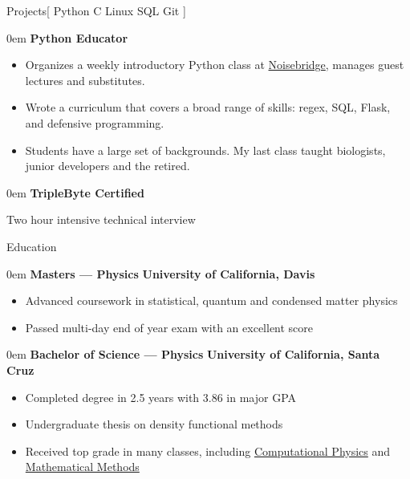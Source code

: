 \documentclass[11pt,a4paper]{article}
\newenvironment{headedsection}[2]{
    \begin{addmargin}[0.5em]{0em}
    {\large\bfseries #1} \hfill {\bfseries #2}%
    \begin{itemize}
        [label={}, topsep=0pt, itemsep=1.5pt, parsep=0pt, leftmargin=1.5em]
}{
    \end{itemize}
    \end{addmargin}
    \medskip
}
\begin{document}
\begin{mysection}{Projects}[
    Python \textbullet{} C \textbullet{} Linux \textbullet{} SQL \textbullet{} Git
]

    \begin{headedsection}{Python Educator}{}
    \item Organizes a weekly introductory Python class at \href{https://www.noisebridge.net/}{Noisebridge}, manages guest lectures and substitutes.
        \item Wrote a curriculum that covers a broad range of skills: regex, SQL, Flask, and defensive programming.
        \item Students have a large set of backgrounds.
            My last class taught biologists, junior developers and the retired.
    \end{headedsection}

    \begin{headedsection}{TripleByte Certified}
        \item Two hour intensive technical interview
    \end{headedsection}
\end{mysection}

\begin{mysection}{Education}
    \begin{headedsection}{Masters --- Physics}
          {University of California, Davis}

        \item Advanced coursework in statistical, quantum and condensed matter
            physics
        \item Passed multi-day end of year exam with an excellent score
    \end{headedsection}

    \begin{headedsection}{Bachelor of Science --- Physics}
          {University of California, Santa Cruz}

        \item Completed degree in 2.5 years with 3.86 in major GPA
        \item Undergraduate thesis on density functional methods
        \item Received top grade in many classes, including 
            \href{http://young.physics.ucsc.edu/115/}{Computational Physics}
            and
            \href{http://scipp.ucsc.edu/~haber/ph116C/}{Mathematical Methods}
    \end{headedsection}
\end{mysection}
\end{document}
